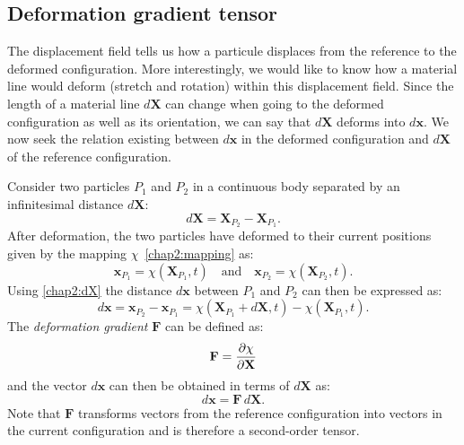 	\subsection{Deformation gradient tensor}
The displacement field tells us how a \ON particule \OFF displaces from the reference to the deformed configuration. \ON More interestingly, we would like to know how a material line would deform (stretch and rotation) within this displacement field. \OFF Since the length of a material line $d\mathbf{X}$ can change when going to the deformed configuration as well as its orientation, we can say that $d\mathbf{X}$ deforms into $d\mathbf{x}$. \ON We now seek the relation existing between $d\mathbf{x}$ in the deformed configuration and $d\mathbf{X}$ of the reference configuration. \OFF

Consider two particles $P_{1}$ and $P_{2}$ in a continuous body separated by an infinitesimal distance $d\mathbf{X}$:
\begin{equation}
\label{chap2:dX}
d\mathbf{X} = \mathbf{X}_{P_{2}} - \mathbf{X}_{P_{1}}.
\end{equation}
After deformation, the two particles have deformed to their current positions given by the mapping $\chi$~\eqref{chap2:mapping} as:
\begin{equation}
\mathbf{x}_{P_1} = \chi(\mathbf{X}_{P_{1}}, t) \quad \mbox{and} \quad \mathbf{x}_{P_2} = \chi(\mathbf{X}_{P_{2}}, t).
\end{equation}
Using \eqref{chap2:dX} the distance $d\textbf{x}$ between $P_{1}$ and $P_{2}$ can then be expressed as:
\begin{equation}
d\mathbf{x} = \mathbf{x}_{P_{2}} - \mathbf{x}_{P_{1}} = \chi(\mathbf{X}_{P_{1}} + d\mathbf{X}, t) - \chi(\mathbf{X}_{P_{1}}, t).
\end{equation}
The \emph{deformation gradient} $\textbf{F}$ can be defined as:
\begin{equation}
\mathbf{F} = \dfrac{\partial \chi}{\partial \mathbf{X}}
\end{equation}
and the vector $d\textbf{x}$ can then be obtained in terms of $d\mathbf{X}$ as:
\begin{equation}
\label{chap2:dxdX}
d\textbf{x} = \textbf{F} \, d\textbf{X}.
\end{equation}
Note that $\textbf{F}$ transforms vectors from the reference configuration into vectors in the current configuration and is therefore a second-order tensor.

